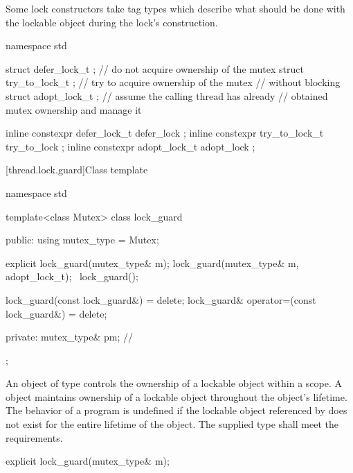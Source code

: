\pnum
Some lock constructors take tag types which describe what should be done with the lockable
object during the lock's construction.

%
%
%
%
%
%
\begin{codeblock}
namespace std {
  struct defer_lock_t  { };     // do not acquire ownership of the mutex
  struct try_to_lock_t { };     // try to acquire ownership of the mutex
                                // without blocking
  struct adopt_lock_t  { };     // assume the calling thread has already
                                // obtained mutex ownership and manage it

  inline constexpr defer_lock_t   defer_lock { };
  inline constexpr try_to_lock_t  try_to_lock { };
  inline constexpr adopt_lock_t   adopt_lock { };
}
\end{codeblock}

[thread.lock.guard]{Class template }

%
\begin{codeblock}
namespace std {
  template<class Mutex>
  class lock_guard {
  public:
    using mutex_type = Mutex;

    explicit lock_guard(mutex_type& m);
    lock_guard(mutex_type& m, adopt_lock_t);
    ~lock_guard();

    lock_guard(const lock_guard&) = delete;
    lock_guard& operator=(const lock_guard&) = delete;

  private:
    mutex_type& pm;             // \expos
  };
}
\end{codeblock}

\pnum
An object of type  controls the ownership of a lockable object
within a scope. A  object maintains ownership of a lockable
object throughout the  object's lifetime.
The behavior of a program is undefined if the lockable object referenced by
 does not exist for the entire lifetime of the 
object. The supplied  type shall meet the 
requirements.

%
\begin{itemdecl}
explicit lock_guard(mutex_type& m);
\end{itemdecl}

